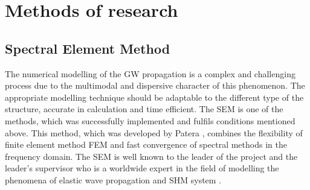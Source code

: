\documentclass[a4paper,12pt]{article}
\begin{document}
\section{Methods of research}
\subsection{Spectral Element Method}
The numerical modelling of the GW propagation is a complex and challenging process due to the multimodal and dispersive character of this phenomenon. The appropriate modelling technique should be adaptable to the different type of the structure, accurate in calculation and time efficient. The SEM is one of the methods, which was successfully implemented and fulfils conditions mentioned above. This method, which was developed by Patera \cite{patera1984spectral}, combines the flexibility of finite element method FEM and fast convergence of spectral methods in the frequency domain. The SEM is well known to the leader of the project \cite{fiborek2018time, sikdar2018effects} and the leader's supervisor who is a worldwide expert in the field of modelling the phenomena of elastic wave propagation \cite{kudela2007modelling,kudela20093d,kudela2016parallel} and SHM system \cite{ostachowicz2009damage}.
\end{document}
